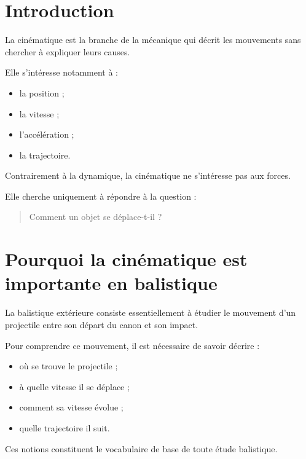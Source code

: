 
\section{Introduction}

La cinématique est la branche de la mécanique qui décrit les mouvements sans
chercher à expliquer leurs causes.

Elle s'intéresse notamment à :

\begin{itemize}
    \item la position ;
    \item la vitesse ;
    \item l'accélération ;
    \item la trajectoire.
\end{itemize}

Contrairement à la dynamique, la cinématique ne s'intéresse pas aux forces.

Elle cherche uniquement à répondre à la question :

\begin{quote}
Comment un objet se déplace-t-il ?
\end{quote}

\section{Pourquoi la cinématique est importante en balistique}

La balistique extérieure consiste essentiellement à étudier le mouvement d'un
projectile entre son départ du canon et son impact.

Pour comprendre ce mouvement, il est nécessaire de savoir décrire :

\begin{itemize}
    \item où se trouve le projectile ;
    \item à quelle vitesse il se déplace ;
    \item comment sa vitesse évolue ;
    \item quelle trajectoire il suit.
\end{itemize}

Ces notions constituent le vocabulaire de base de toute étude balistique.

